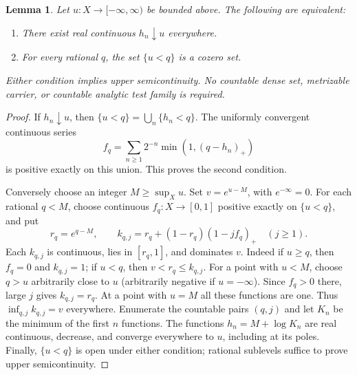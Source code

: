 \documentclass[11pt]{article}
\newtheorem{lemma}[theorem]{Lemma}
\begin{document}
\begin{lemma}\label{barriers}
Let $u:X\to[-\infty,\infty)$ be bounded above. The following are
equivalent:
\begin{enumerate}
\item There exist real continuous $h_n\downarrow u$ everywhere.
\item For every rational $q$, the set $\{u<q\}$ is a cozero set.
\end{enumerate}
Either condition implies upper semicontinuity. No countable dense set,
metrizable carrier, or countable analytic test family is required.
\end{lemma}
\begin{proof}
If $h_n\downarrow u$, then $\{u<q\}=\bigcup_n\{h_n<q\}$.
The uniformly convergent continuous series
\[
 f_q=\sum_{n\ge1}2^{-n}\min(1,(q-h_n)_+)
\]
is positive exactly on this union. This proves the second condition.

Conversely choose an integer $M\ge\sup_Xu$. Set $v=e^{u-M}$, with
$e^{-\infty}=0$. For each rational $q<M$, choose continuous
$f_q:X\to[0,1]$ positive exactly on $\{u<q\}$, and put
\[
 r_q=e^{q-M},\qquad
 k_{q,j}=r_q+(1-r_q)(1-jf_q)_+\quad(j\ge1).
\]
Each $k_{q,j}$ is continuous, lies in $[r_q,1]$, and dominates $v$.
Indeed if $u\ge q$, then $f_q=0$ and $k_{q,j}=1$; if $u<q$, then
$v<r_q\le k_{q,j}$. For a point with $u<M$, choose $q>u$ arbitrarily
close to $u$ (arbitrarily negative if $u=-\infty$). Since $f_q>0$ there,
large $j$ gives $k_{q,j}=r_q$. At a point with $u=M$ all these functions
are one. Thus $\inf_{q,j}k_{q,j}=v$ everywhere. Enumerate the countable
pairs $(q,j)$ and let $K_n$ be the minimum of the first $n$ functions.
The functions $h_n=M+\log K_n$ are real continuous, decrease, and
converge everywhere to $u$, including at its poles. Finally,
$\{u<q\}$ is open under either condition; rational sublevels suffice
to prove upper semicontinuity.
\end{proof}
\end{document}
